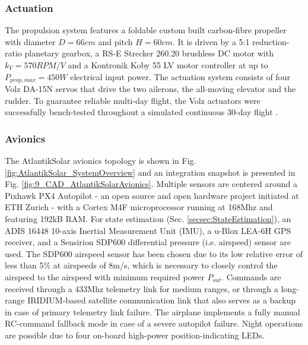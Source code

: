 \subsubsection{Actuation}
The propulsion system features a foldable custom built carbon-fibre propeller with diameter $D=66cm$ and pitch $H=60cm$. It is driven by a 5:1 reduction-ratio planetary gearbox, a RS-E Strecker 260.20 brushless DC motor with $k_V=570RPM/V$ and a Kontronik Koby 55 LV motor controller at up to $P_{prop,max}=450W$ electrical input power. The actuation system consists of four Volz DA-15N servos that drive the two ailerons, the all-moving elevator and the rudder. To guarantee reliable multi-day flight, the Volz actuators were successfully bench-tested throughout a simulated continuous 30-day flight \cite{DellaCa_BT}.

\subsubsection{Avionics}
The AtlantikSolar avionics topology is shown in Fig. \ref{fig:AtlantikSolar_SystemOverview} and an integration snapshot is presented in Fig. \ref{fig:9_CAD_AtlantikSolarAvionics}. Multiple sensors are centered around a Pixhawk PX4 Autopilot - an open source and open hardware project initiated at ETH Zurich - with a Cortex M4F microprocessor running at 168Mhz and featuring 192kB RAM. For state estimation (Sec. \ref{secsec:StateEstimation}), an ADIS 16448 10-axis Inertial Measurement Unit (IMU), a u-Blox LEA-6H GPS receiver, and a Sensirion SDP600 differential pressure (i.e. airspeed) sensor are used. The SDP600 airspeed sensor has been chosen due to its low relative error of less than 5\% at airspeeds of 8m/s, which is necessary to closely control the airspeed to the airspeed with minimum required power $P_{out}$. Commands are received through a 433Mhz telemetry link for medium ranges, or through a long-range IRIDIUM-based satellite communication link that also serves as a backup in case of primary telemetry link failure. The airplane implements a fully manual RC-command fallback mode in case of a severe autopilot failure. Night operations are possible due to four on-board high-power position-indicating LEDs.

